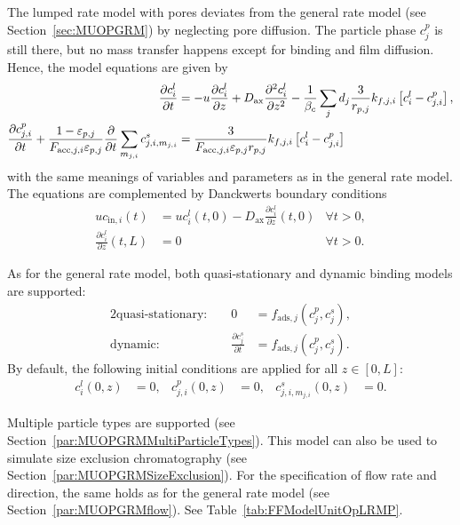 The lumped rate model with pores  \cite{Guiochon2006,Felinger2004} deviates from the general rate model (see Section~\ref{sec:MUOPGRM}) by neglecting pore diffusion.
The particle phase $c^p_j$ is still there, but no mass transfer happens except for binding and film diffusion.
Hence, the model equations are given by
\begin{align}
	\frac{\partial c^l_i}{\partial t} &= -u \frac{\partial c^l_i}{\partial z} + D_{\text{ax}} \frac{\partial^2 c^l_i}{\partial z^2} - \frac{1}{\beta_c} \sum_{j} d_j \frac{3}{r_{p,j}} k_{f,j,i}\left[ c^l_i - c^p_{j,i} \right], \\
	\frac{\mathop{}\!\mathrm{\partial} c^p_{j,i}}{\mathop{}\!\mathrm{\partial} t} + \frac{1 - \varepsilon_{p,j}}{F_{\text{acc},j,i} \varepsilon_{p,j}} \frac{\mathop{}\!\mathrm{\partial}}{\mathop{}\!\mathrm{\partial} t} \sum_{m_{j,i}} c^s_{j,i,m_{j,i}} &= \frac{3}{F_{\text{acc},j,i} \varepsilon_{p,j} r_{p,j}}k_{f,j,i}\left[ c^l_i - c^p_{j,i} \right]
\end{align}
with the same meanings of variables and parameters as in the general rate model. 
The equations are complemented by Danckwerts boundary conditions \cite{Danckwerts1953}
\begin{align*}
	u c_{\text{in},i}(t) &= u c^l_i(t,0) - D_{\text{ax}} \frac{\partial c^l_i}{\partial z}(t, 0) & \forall t > 0,\\
	\frac{\partial c^l_i}{\partial z}(t, L) &= 0 & \forall t > 0.
\end{align*}

As for the general rate model, both quasi-stationary and dynamic binding models are supported:
\begin{alignat*}{2}
	\text{quasi-stationary: }& & 0 &= f_{\text{ads},j}\left( c^p_j, c^s_j\right), \\
	\text{dynamic: }& & \frac{\partial c^s_j}{\partial t} &= f_{\text{ads},j}\left( c^p_j, c^s_j\right).
\end{alignat*}
By default, the following initial conditions are applied for all $z \in [0,L]$:
\begin{align}
	c^l_i(0, z) &= 0, & c^p_{j,i}(0, z) &= 0, & c^s_{j,i,m_{j,i}}(0,z) &= 0.
\end{align}

Multiple particle types are supported (see Section~\ref{par:MUOPGRMMultiParticleTypes}).
This model can also be used to simulate size exclusion chromatography (see Section~\ref{par:MUOPGRMSizeExclusion}).
For the specification of flow rate and direction, the same holds as for the general rate model (see Section~\ref{par:MUOPGRMflow}).
See Table~\ref{tab:FFModelUnitOpLRMP}.

